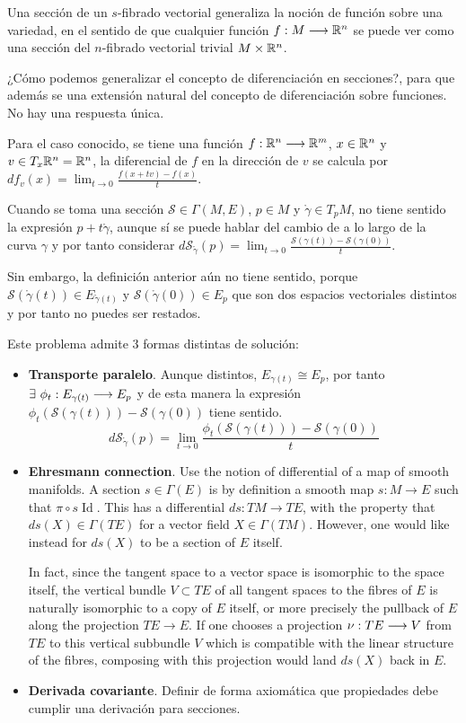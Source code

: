 Una sección de un $s$-fibrado vectorial generaliza la noción de función sobre una variedad, en el sentido de
que cualquier
función $f:M\longrightarrow \mathbb{R}^n$ se puede ver como una sección del $n$-fibrado vectorial trivial $M\times\mathbb{R}^n$.

¿Cómo podemos generalizar el concepto de diferenciación en secciones?, para que además se una extensión natural del
concepto de diferenciación sobre funciones.
No hay una respuesta única.

Para el caso conocido, se tiene una función $f:\mathbb{R}^n\longrightarrow \mathbb{R}^m$, $x\in\mathbb{R}^n$ y $v\in T_x \mathbb{R}^n=\mathbb{R}^n$, la diferencial
de $f$ en la dirección de $v$ se calcula por $df_v(x)=\lim_{t\to 0}{\frac {f(x+tv)-f(x)}{t}}$.

Cuando se toma una sección $\mathcal{S}\in\Gamma(M, E)$, $p\in M$ y $\mathring{\gamma}\in T_p M$, no tiene sentido la
expresión $p+t\mathring{\gamma}$, aunque sí se puede hablar del cambio de  a lo largo de la curva $\gamma$
y por tanto considerar $d\mathcal{S}_{\mathring{\gamma}}(p)=\lim_{t\to 0}\frac{\mathcal{S}(\gamma (t))-\mathcal{S}
(\gamma (0))}{t}$.

Sin embargo, la definición anterior aún no tiene sentido, porque $\mathcal{S}(\mathring{\gamma}(t))\in
E_{\mathring{\gamma}(t)}$ y $\mathcal{S}(\mathring{\gamma}(0))\in E_p$ que son dos espacios vectoriales distintos y
por tanto no puedes ser restados.

Este problema admite 3 formas distintas de solución:
\begin{itemize}
  \item \textbf{Transporte paralelo}.
  Aunque distintos, $E_{\gamma(t)}\cong E_p$, por tanto $\exists\ \phi_t:E_{\gamma(t)
  }\longrightarrow E_p$ y de esta manera la expresión $\phi_t(\mathcal{S}(\gamma (t)))-\mathcal{S}(\gamma (0))$ tiene sentido.
  \[
    d\mathcal{S}_{\mathring{\gamma}}(p)=\lim_{t\to 0}\frac{\phi_t(\mathcal{S}(\gamma (t)))-\mathcal{S}
    (\gamma (0))}{t}
  \]

  \item \textbf{Ehresmann connection}.
  Use the notion of differential of a map of smooth manifolds.
  A section $s\in \Gamma (E)$ is by definition a smooth map $s:M\to E$ such
  that $\pi \circ s\operatorname{Id}$.
  This has a differential $ds:TM\to TE$, with the property that $ds(X)\in \Gamma (TE)$
  for a vector field $X\in \Gamma (TM)$.
  However, one would like instead for $ds(X)$ to be a section of $E$ itself.

  In fact, since the tangent space to a vector space is isomorphic to the space itself, the vertical bundle
  $V\subset TE$ of all tangent spaces to the fibres of $E$ is naturally isomorphic to a copy of $E$
  itself, or more precisely the pullback of $E$ along the projection $TE\to E$.
  If one chooses a projection $\nu:TE\longrightarrow V$ from $TE$ to this vertical subbundle
  $V$ which is compatible with the linear structure of the fibres, composing with this projection would land
  $ds(X)$ back in $E$.


  \item \textbf{Derivada covariante}.
  Definir de forma axiomática que propiedades debe cumplir una derivación para secciones.
\end{itemize}

